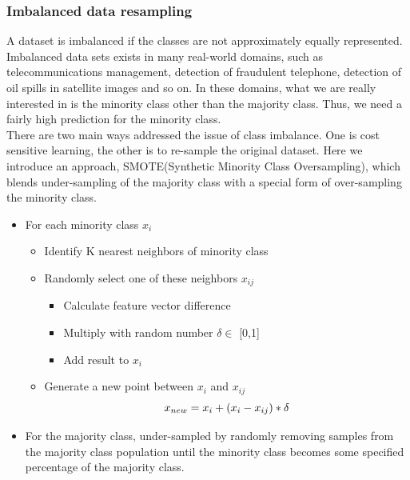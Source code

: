 	\subsubsection{Imbalanced data resampling}
	\noindent A dataset is imbalanced if the classes are not approximately equally represented. Imbalanced
	data sets exists in many real-world domains, such as telecommunications management, detection of fraudulent telephone, detection of oil spills in satellite images and so on. In these domains, what we are really interested in is the minority class other than the majority class. Thus, we need a fairly high prediction for the minority class. \\
	[\baselineskip]\noindent There are two main ways addressed the issue of class imbalance.	One is cost sensitive learning, the other is to re-sample the original dataset. Here we introduce an approach, SMOTE(Synthetic Minority Class Oversampling), which blends under-sampling of the majority class with a special form of over-sampling the minority class.\citep{smote}
	 \begin{itemize}
		\item For each minority class \boldmath$ x_{i} $
			\begin{itemize}
		 	\item Identify K nearest neighbors of minority class
		 	\item Randomly select one of these neighbors \boldmath$ x_{ij} $
		 	\begin{itemize}
		 	\item Calculate feature vector difference
		 	\item Multiply with random number $\delta \in$ [0,1]
		 	\item Add result to \boldmath$ x_{i} $
		 	\end{itemize}
			\item Generate a new point between $ x_{i} $ and $x_{ij} $\\
     \begin{equation}\label{}
x_{new} =  x_{i} + (x_{i}-x_{ij})*\delta \\
    \end{equation}
		\end{itemize}
		\item For the majority class, under-sampled by randomly removing samples from the majority class
		population until the minority class becomes some specified percentage of the majority class.
	\end{itemize}
	 
